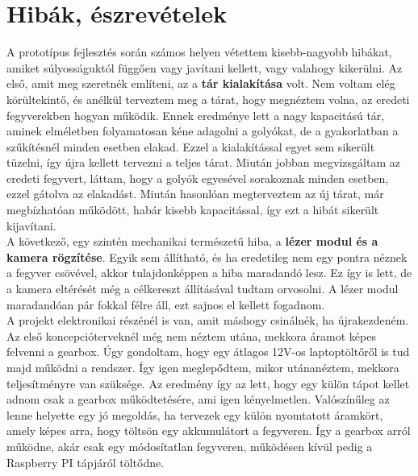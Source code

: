 \chapter{Hibák, észrevételek}

A prototípus fejlesztés során számos helyen vétettem kisebb-nagyobb hibákat, amiket súlyosságuktól függően vagy javítani kellett, vagy valahogy kikerülni. Az első, amit meg szeretnék említeni, az a \textbf{tár kialakítása} volt. Nem voltam elég körültekintő, és anélkül terveztem meg a tárat, hogy megnéztem volna, az eredeti fegyverekben hogyan működik. Ennek eredménye lett a nagy kapacitású tár, aminek elméletben folyamatosan kéne adagolni a golyókat, de a gyakorlatban a szűkítésnél minden esetben elakad. Ezzel a kialakítással egyet sem sikerült tüzelni, így újra kellett tervezni a teljes tárat. Miután jobban megvizsgáltam az eredeti fegyvert, láttam, hogy a golyók egyesével sorakoznak minden esetben, ezzel gátolva az elakadást. Miután hasonlóan megterveztem az új tárat, már megbízhatóan működött, habár kisebb kapacitással, így ezt a hibát sikerült kijavítani.\\

A következő, egy szintén mechanikai természetű hiba, a \textbf{lézer modul és a kamera rögzítése}. Egyik sem állítható, és ha eredetileg nem egy pontra néznek a fegyver csövével, akkor tulajdonképpen a hiba maradandó lesz. Ez így is lett, de a kamera eltérését még a célkereszt állításával tudtam orvosolni. A lézer modul maradandóan pár fokkal félre áll, ezt sajnos el kellett fogadnom.\\

A projekt elektronikai részénél is van, amit máshogy csinálnék, ha újrakezdeném. Az első koncepcióterveknél még nem néztem utána, mekkora áramot képes felvenni a gearbox. Úgy gondoltam, hogy egy átlagos 12V-os laptoptöltőről is tud majd működni a rendszer. Így igen meglepődtem, mikor utánanéztem, mekkora teljesítményre van szüksége. Az eredmény így az lett, hogy egy külön tápot kellet adnom csak a gearbox működtetésére, ami igen kényelmetlen. Valószínűleg az lenne helyette egy jó megoldás, ha tervezek egy külön nyomtatott áramkört, amely képes arra, hogy töltsön egy akkumulátort a fegyveren. Így a gearbox arról működne, akár csak egy módosítatlan fegyveren, működésen kívül pedig a Raspberry PI tápjáról töltődne. 